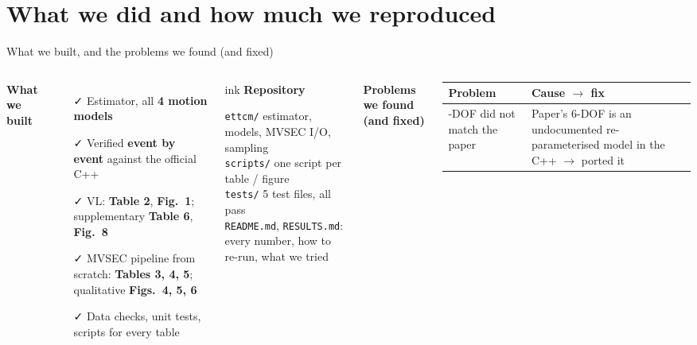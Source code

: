 \documentclass[aspectratio=169,10pt]{beamer}
\newcommand{\ok}{{\color{teal}\faCheck}}
\newcommand{\sectag}{}
\newcommand{\settag}[1]{\renewcommand{\sectag}{#1}}
\renewcommand{\arraystretch}{1.12}
\begin{document}
\section{What we did and how much we reproduced}
\settag{6\enspace What we did and how much}

\begin{frame}{What we built, and the problems we found (and fixed)}
  \begin{columns}[T,onlytextwidth]
    {\color{titlebar}\bfseries What we built}
    \begin{itemize}\footnotesize\setlength{\itemsep}{0pt}
      \item[\ok] Estimator, all \textbf{4 motion models}
      \item[\ok] Verified \textbf{event by event} against the official C++
      \item[\ok] VL: \textbf{Table 2}, \textbf{Fig.~1}; supplementary \textbf{Table 6}, \textbf{Fig.~8}
      \item[\ok] MVSEC pipeline from scratch: \textbf{Tables 3, 4, 5}; qualitative \textbf{Figs.~4, 5, 6}
      \item[\ok] Data checks, unit tests, scripts for every table
    \end{itemize}
    \begin{card}[fontupper=\footnotesize\raggedright,before skip=1mm]{ink}
      \textbf{Repository}\par
      \texttt{ettcm/} estimator, models, MVSEC I/O, sampling\\
      \texttt{scripts/} one script per table / figure\\
      \texttt{tests/} 5 test files, all pass\\
      \texttt{README.md}, \texttt{RESULTS.md}: every number, how to re-run, what we tried
    \end{card}
    {\color{titlebar}\bfseries Problems we found (and fixed)}\par\vspace{1mm}
    \footnotesize\renewcommand{\arraystretch}{1.05}
    \begin{tabular}{@{}>{\raggedright\arraybackslash}p{2.45cm}>{\raggedright\arraybackslash}p{5.45cm}@{}}
      \toprule
      Problem & Cause $\rightarrow$ fix \\
      \midrule
      6-DOF did not match the paper & Paper's 6-DOF is an \alert{undocumented re-parameterised model} in the C++ $\rightarrow$ ported it \\

\end{tabular}
\end{columns}
\end{frame}
\end{document}
